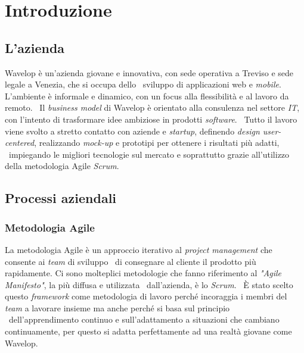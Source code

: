 
\chapter{Introduzione}
\label{cap:intro}
\section{L'azienda}
Wavelop è un'azienda giovane e innovativa, con sede operativa a Treviso e sede legale a Venezia, che si occupa dello \
sviluppo di applicazioni web e \emph{mobile}. L'ambiente è informale e dinamico, con un focus alla flessibilità e al lavoro da remoto. \
Il \emph{business model} di Wavelop è orientato alla consulenza nel settore \emph{IT}, con l'intento di trasformare idee ambiziose in prodotti \emph{software}. \
Tutto il lavoro viene svolto a stretto contatto con aziende e \emph{startup}, definendo \emph{design user-centered}, realizzando \emph{\gls{mock-up}} e prototipi per ottenere i risultati più adatti, \
impiegando le migliori tecnologie sul mercato e soprattutto grazie all'utilizzo della metodologia Agile \emph{Scrum}.

\section{Processi aziendali}

\subsection{Metodologia Agile}
La metodologia Agile è un approccio iterativo al \emph{project management} che consente ai \emph{team} di sviluppo \
di consegnare al cliente il prodotto più rapidamente. Ci sono molteplici metodologie che fanno riferimento al \emph{"Agile Manifesto"}, la più diffusa e utilizzata \
dall'azienda, è lo \emph{Scrum}. \
È stato scelto questo \emph{framework} come metodologia di lavoro perché incoraggia i membri del \emph{team} a lavorare insieme ma anche perché si basa sul principio \
dell'apprendimento continuo e sull'adattamento a situazioni che cambiano continuamente, per questo si adatta perfettamente ad una realtà giovane come Wavelop. \\

